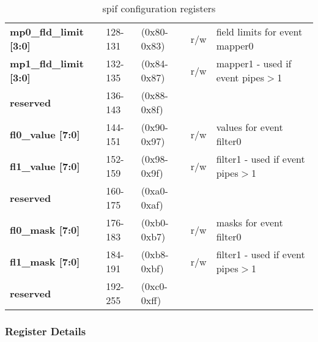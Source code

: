 \documentclass[11pt,a4paper,twoside]{article}
\begin{document}
\begin{center}
\begin{table}[!h]
\begin{tabularx}{\textwidth}{| p{36mm} p{13mm} p{21mm} p{7mm} X |}
		\textbf{mp0\_fld\_limit [3:0]}       & 128-131                    & (0x80-0x83)                    & r/w                 & field limits for event mapper0  \\%
		\textbf{mp1\_fld\_limit [3:0]}       & 132-135                    & (0x84-0x87)                    & r/w                 & mapper1 - used if event pipes$>$1  \\%
		\cellcolor{gray!25}\textbf{reserved} & \cellcolor{gray!25}136-143 & \cellcolor{gray!25}(0x88-0x8f) & \cellcolor{gray!25} & \cellcolor{gray!25}\\%
		\textbf{fl0\_value [7:0]}            & 144-151                    & (0x90-0x97)                    & r/w                 & values for event filter0  \\%
		\textbf{fl1\_value [7:0]}            & 152-159                    & (0x98-0x9f)                    & r/w                 & filter1 - used if event pipes$>$1  \\%
		\cellcolor{gray!25}\textbf{reserved} & \cellcolor{gray!25}160-175 & \cellcolor{gray!25}(0xa0-0xaf) & \cellcolor{gray!25} & \cellcolor{gray!25}\\%
		\textbf{fl0\_mask [7:0]}             & 176-183                    & (0xb0-0xb7)                    & r/w                 & masks for event filter0  \\%
		\textbf{fl1\_mask [7:0]}             & 184-191                    & (0xb8-0xbf)                    & r/w                 & filter1 - used if event pipes$>$1  \\%
		\cellcolor{gray!25}\textbf{reserved} & \cellcolor{gray!25}192-255 & \cellcolor{gray!25}(0xc0-0xff) & \cellcolor{gray!25} & \cellcolor{gray!25}\\%
		\hline
	\end{tabularx}
	\caption{spif configuration registers}
	\label{tab:spif_regs}
\end{table}
\end{center}


\vspace{-5mm}
    
\subsubsection*{Register Details}
\end{document}
